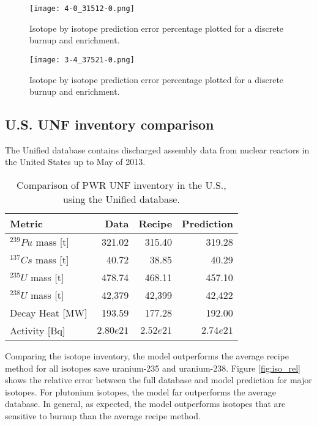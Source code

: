\begin{figure}
    \centering
    \texttt{[image: 4-0\_31512-0.png]}
    \caption{Isotope by isotope prediction error percentage
             plotted for a discrete burnup and enrichment.
             }
    \label{fig:40_31512}
\end{figure}
    

\begin{figure}
    \centering
    \texttt{[image: 3-4\_37521-0.png]}
    \caption{Isotope by isotope prediction error percentage
             plotted for a discrete burnup and enrichment.}
    \label{fig:34_37521}
\end{figure}

\subsection{U.S. \gls{UNF} inventory comparison}


The Unified database contains discharged assembly data
from nuclear reactors in the United States up to May of
2013. 

\begin{table}[h]
    \centering
    \begin{tabular}{lrrr}
        \hline
        Metric & Data & Recipe & Prediction \\
        \hline
        $^{239}Pu$ mass [t] & 321.02 & 315.40 & 319.28\\
        $^{137}Cs$ mass [t] & 40.72 & 38.85 & 40.29 \\
        $^{235}U$ mass [t] & 478.74 & 468.11 & 457.10\\
        $^{238}U$ mass [t] & 42,379 & 42,399 & 42,422\\
        \hline
        Decay Heat [MW] & 193.59 & 177.28 & 192.00 \\
        Activity [Bq] & $2.80e21$ & $2.52e21$ & $2.74e21$ \\
        \hline
    \end{tabular}
    \caption{Comparison of \gls{PWR} \gls{UNF} inventory in the U.S.,
             using the Unified database.}
\end{table}


Comparing the isotope inventory, the model outperforms the
average recipe method for all isotopes save uranium-235 and
uranium-238. Figure \ref{fig:iso_rel} shows the relative
error between the full database and model prediction for
major isotopes. For plutonium isotopes, the model far
outperforms the average database. In general, as expected,
the model outperforms isotopes that are sensitive to burnup
than the average recipe method.


